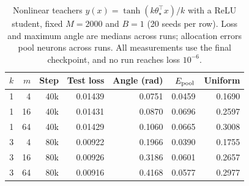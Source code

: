 \begin{table}[htbp]
\centering
\small
\setlength{\tabcolsep}{4pt}
\begin{tabular}{rrrrrrr}
\toprule
$k$ & $m$ & Step & Test loss & Angle (rad) & $E_{\rm pool}$ & Uniform \\
\midrule
1 & 4 & 40k & 0.01439 & 0.0751 & 0.0459 & 0.1690 \\
1 & 16 & 40k & 0.01431 & 0.0870 & 0.0696 & 0.2597 \\
1 & 64 & 40k & 0.01429 & 0.1060 & 0.0665 & 0.3008 \\
3 & 4 & 80k & 0.00922 & 0.1966 & 0.0390 & 0.1755 \\
3 & 16 & 80k & 0.00926 & 0.3186 & 0.0601 & 0.2657 \\
3 & 64 & 80k & 0.00916 & 0.4168 & 0.0577 & 0.2977 \\
\bottomrule
\end{tabular}
\caption{Nonlinear teachers $y(x)=\tanh(k\theta_\star^\top x)/k$ with a ReLU student, fixed $M=2000$ and $B=1$ (20 seeds per row). Loss and maximum angle are medians across runs; allocation errors pool neurons across runs. All measurements use the final checkpoint, and no run reaches loss $10^{-6}$.}
\label{tab:h-nonlinear}
\end{table}
